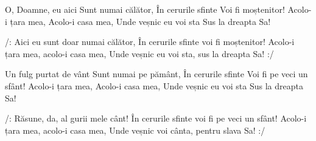 \beginverse
O, Doamne, eu aici
Sunt numai călător,
În cerurile sfinte
Voi fi moștenitor!
Acolo-i țara mea,
Acolo-i casa mea,
Unde veșnic eu voi sta
Sus la dreapta Sa!
\endverse

\beginchorus
/: Aici eu sunt doar numai călător,
În cerurile sfinte voi fi moștenitor!
Acolo-i țara mea, acolo-i casa mea,
Unde veșnic eu voi sta, sus la dreapta Sa! :/
\endchorus

\beginverse
Un fulg purtat de vânt
Sunt numai pe pământ,
În cerurile sfinte
Voi fi pe veci un sfânt!
Acolo-i țara mea,
Acolo-i casa mea,
Unde veșnic eu voi sta
Sus la dreapta Sa!
\endverse

\beginchorus
/: Răsune, da, al gurii mele cânt!
În cerurile sfinte voi fi pe veci un sfânt!
Acolo-i țara mea, acolo-i casa mea,
Unde veșnic voi cânta, pentru slava Sa! :/
\endchorus
\endsong